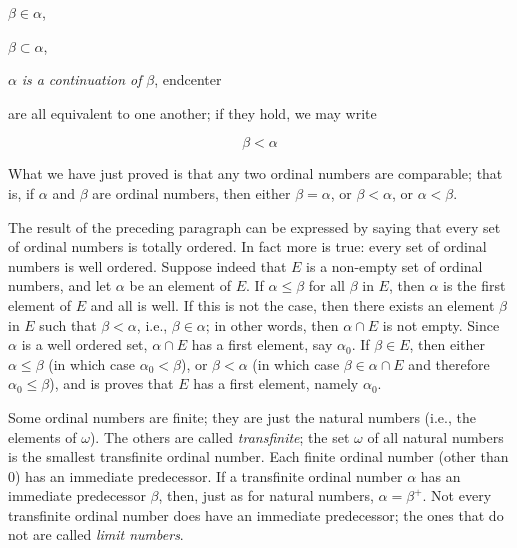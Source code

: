\begin{center}
$\beta \in \alpha$,

$\beta \subset \alpha$,

$\alpha$ \textit{is a continuation of} $\beta$,
end{center}
\end{center}

are all equivalent to one another; if they hold, we may write

\begin{equation*}
\beta < \alpha
\end{equation*}

What we have just proved is that any two ordinal numbers are comparable; that is, if $\alpha$ and $\beta$ are ordinal numbers, then either $\beta = \alpha$, or $\beta < \alpha$, or $\alpha < \beta$. 

The result of the preceding paragraph can be expressed by saying that every set of ordinal numbers is totally ordered. In fact more is true: every set of ordinal numbers is well ordered. Suppose indeed that $E$ is a non-empty set of ordinal numbers, and let $\alpha$ be an element of $E$. If $\alpha \le  \beta$ for all $\beta$ in $E$, then $\alpha$ is the first element of $E$ and all is well. If this is not the case, then there exists an element $\beta$ in $E$ such that $\beta < \alpha$, i.e., $\beta \in \alpha$; in other words, then $\alpha \cap E$ is not empty. Since $\alpha$ is a well ordered set, $\alpha \cap E$ has a first element, say $\alpha_{0}$. If $\beta \in E$, then either $\alpha \le \beta$ (in which case $\alpha_{0} < \beta$), or $\beta < \alpha$ (in which case $\beta \in \alpha \cap E$ and therefore $\alpha_{0} \le \beta$), and is proves that $E$ has a first element, namely $\alpha_{0}$.

Some ordinal numbers are finite; they are just the natural numbers (i.e., the elements of $\omega$). The others are called \textit{transfinite}; the set $\omega$ of all natural numbers is the smallest transfinite ordinal number. Each finite ordinal number (other than $0$) has an immediate predecessor. If a transfinite ordinal number $\alpha$ has an immediate predecessor $\beta$, then, just as for natural numbers, $\alpha = \beta^{+}$. Not every transfinite ordinal number does have an immediate predecessor; the ones that do not are called \textit{limit numbers}. 

